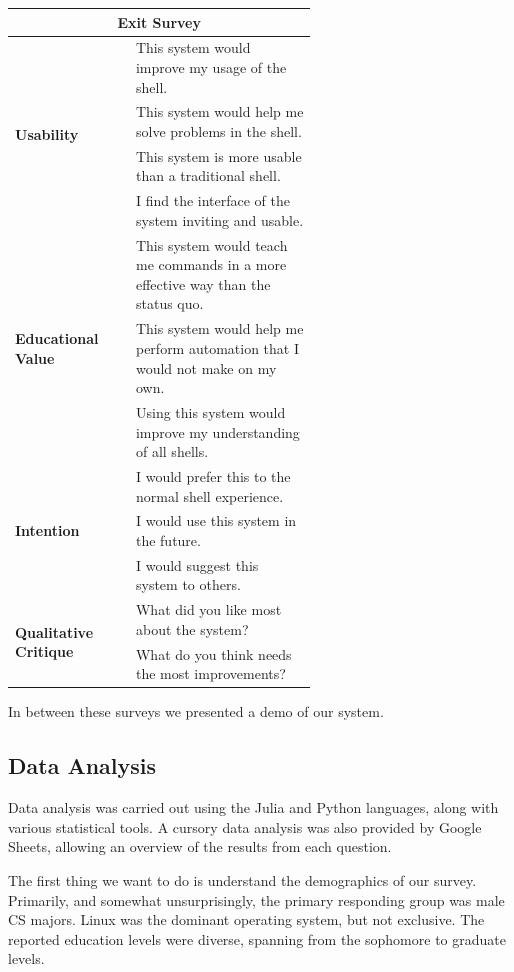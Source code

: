 \begin{center}
  \begin{tabular}{|l|p{0.6\linewidth}|}
    \hline \multicolumn{2}{|c|}{\textbf{\Large Exit Survey}} \\ \hline
    \multirow{4}{*}{\textbf{Usability}}
    & This system would improve my usage of the shell. \\ \cline{2-2}
    & This system would help me solve problems in the shell. \\ \cline{2-2}
    & This system is more usable than a traditional shell. \\ \cline{2-2}
    & I find the interface of the system inviting and usable. \\
    \hline
    \multirow{3}{*}{\textbf{Educational Value}}
    & This system would teach me commands in a more effective way than the
      status quo. \\ \cline{2-2}
    & This system would help me perform automation that I would not make on my
      own.\\ \cline{2-2}
    & Using this system would improve my understanding of all shells.\\
    \hline
    \multirow{3}{*}{\textbf{Intention}}
    & I would prefer this to the normal shell experience. \\ \cline{2-2}
    & I would use this system in the future. \\ \cline{2-2}
    & I would suggest this system to others. \\
    \hline
    \multirow{2}{*}{\textbf{Qualitative Critique}}
    & What did you like most about the system?  \\ \cline{2-2}
    & What do you think needs the most improvements? \\
    \hline
  \end{tabular}
\end{center}
In between these surveys we presented a demo of our system.

\subsection{Data Analysis}
Data analysis was carried out using the Julia and Python languages, along with
various statistical tools. A cursory data analysis was also provided by Google
Sheets, allowing an overview of the results from each question.

The first thing we want to do is understand the demographics of our
survey. Primarily, and somewhat unsurprisingly, the primary responding group was
male CS majors. Linux was the dominant operating system, but not exclusive. The
reported education levels were diverse, spanning from the sophomore to graduate
levels.

